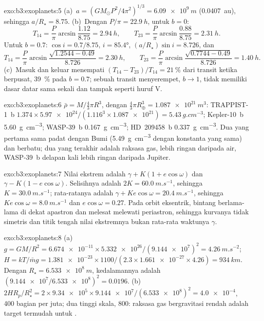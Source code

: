 \begin{solution}{exo:b3:exoplanets:5}
(a)~$a = (GM_\odot P^2/4\pi^2)^{1/3} = \qty{6.09e9}{m}$ (\qty{0.0407}{au}),
sehingga $a/R_\star = 8.75$. (b)~Dengan $P/\pi = \qty{22.9}{h}$, untuk $b = 0$:
\[
T_{14} = \frac P\pi\arcsin\frac{1.12}{8.75} = \qty{2.94}{h}, \qquad
T_{23} = \frac P\pi\arcsin\frac{0.88}{8.75} = \qty{2.31}{h}.
\]
Untuk $b = 0.7$: $\cos i = 0.7/8.75$, $i = \ang{85.4}$, $(a/R_\star)\sin i =
8.726$, dan
\[
T_{14} = \frac P\pi\arcsin\frac{\sqrt{1.2544 - 0.49}}{8.726} = \qty{2.30}{h},
\qquad
T_{23} = \frac P\pi\arcsin\frac{\sqrt{0.7744 - 0.49}}{8.726} = \qty{1.40}{h}.
\]
(c)~Masuk dan keluar menempati $(T_{14} - T_{23})/T_{14} = \qty{21}{\percent}$
dari transit ketika berpusat, \qty{39}{\percent} pada $b = 0.7$; sebuah
transit menyerempet, $b \to 1$, tidak memiliki dasar datar sama sekali dan tampak seperti huruf V.
\end{solution}

\begin{solution}{exo:b3:exoplanets:6}
$\bar\rho = M/\tfrac43\pi R^3$, dengan $\tfrac43\pi R_\oplus^3 =
\qty{1.087e21}{m^3}$: TRAPPIST-1~b $1.374\times\num{5.97e24}/(1.116^3\times
\num{1.087e21}) = \qty{5.43}{g.cm^{-3}}$; Kepler-10~b
\qty{5.60}{g.cm^{-3}}; WASP-39~b \qty{0.167}{g.cm^{-3}}; HD~209458~b
\qty{0.337}{g.cm^{-3}}. Dua yang pertama sama padat dengan Bumi
(\qty{5.49}{g.cm^{-3}} dengan konstanta yang sama) dan berbatu; dua yang terakhir
adalah raksasa gas, lebih ringan daripada air, WASP-39~b delapan kali lebih ringan daripada
Jupiter.
\end{solution}

\begin{solution}{exo:b3:exoplanets:7}
Nilai ekstrem adalah $\gamma + K(1 + e\cos\omega)$ dan $\gamma - K(1 -
e\cos\omega)$. Selisihnya adalah $2K = \qty{60.0}{m.s^{-1}}$, sehingga $K =
\qty{30.0}{m.s^{-1}}$; rata-ratanya adalah $\gamma + Ke\cos\omega =
\qty{20.4}{m.s^{-1}}$, sehingga $Ke\cos\omega = \qty{8.0}{m.s^{-1}}$ dan
$e\cos\omega = 0.27$. Pada orbit eksentrik, bintang berlama-lama di dekat
apastron dan melesat melewati periastron, sehingga kurvanya tidak simetris dan
titik tengah nilai ekstremnya bukan rata-rata waktunya $\gamma$.
\end{solution}

\begin{solution}{exo:b3:exoplanets:8}
(a)~$g = GM/R^2 = \num{6.674e-11}\times\num{5.332e26}/(\num{9.144e7})^2 =
\qty{4.26}{m.s^{-2}}$; $H = kT/\bar m g = \num{1.381e-23}\times1100/(2.3
\times\num{1.661e-27}\times4.26) = \qty{934}{km}$. Dengan $R_\star =
\qty{6.533e8}{m}$, kedalamannya adalah $(\num{9.144e7}/\num{6.533e8})^2 =
\num{0.0196}$. (b)~$2HR_p/R_\star^2 = 2\times\num{9.34e5}\times
\num{9.144e7}/(\num{6.533e8})^2 = \num{4.0e-4}$, 400 bagian per juta;
dua tinggi skala, 800: raksasa gas bergravitasi rendah adalah target
termudah untuk .
\end{solution}

